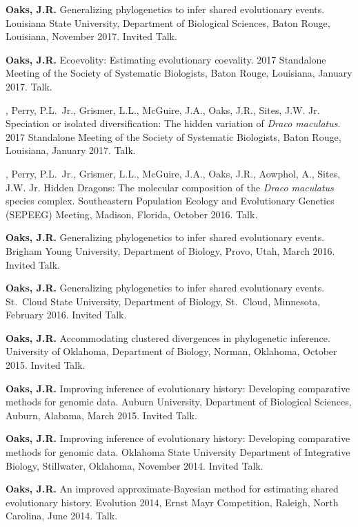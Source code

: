 \myHangIndent
{\bf Oaks, J.R.}
Generalizing phylogenetics to infer shared evolutionary events.
Louisiana State University,
Department of Biological Sciences,
Baton Rouge, Louisiana,
November 2017.
Invited Talk.

\myHangIndent
{\bf Oaks, J.R.}
Ecoevolity: Estimating evolutionary coevality.
2017 Standalone Meeting of the Society of Systematic Biologists,
Baton Rouge, Louisiana,
January 2017.
Talk.

\myHangIndent
{},
Perry, P.L.\ Jr.,
Grismer, L.L.,
McGuire, J.A.,
Oaks, J.R.,
Sites, J.W. Jr.
Speciation or isolated diversification: The hidden variation of \textit{Draco
    maculatus}.
2017 Standalone Meeting of the Society of Systematic Biologists,
Baton Rouge, Louisiana,
January 2017.
Talk.

\myHangIndent
{},
Perry, P.L.\ Jr.,
Grismer, L.L.,
McGuire, J.A.,
Oaks, J.R.,
Aowphol, A.,
Sites, J.W. Jr.
Hidden Dragons: The molecular composition of the \textit{Draco maculatus}
species complex.
Southeastern Population Ecology and Evolutionary Genetics (SEPEEG) Meeting,
Madison, Florida,
October 2016.
Talk.

\myHangIndent
{\bf Oaks, J.R.}
Generalizing phylogenetics to infer shared evolutionary events.
Brigham Young University,
Department of Biology,
Provo,
Utah, March 2016.
Invited Talk.

\myHangIndent
{\bf Oaks, J.R.}
Generalizing phylogenetics to infer shared evolutionary events.
St.\ Cloud State University,
Department of Biology,
St.\ Cloud,
Minnesota, February 2016.
Invited Talk.

\myHangIndent
{\bf Oaks, J.R.}
Accommodating clustered divergences in phylogenetic inference.
University of Oklahoma,
Department of Biology,
Norman,
Oklahoma, October 2015.
Invited Talk.

\myHangIndent
{\bf Oaks, J.R.}
Improving inference of evolutionary history: Developing comparative methods for
genomic data.
Auburn University,
Department of Biological Sciences,
Auburn,
Alabama, March 2015.
Invited Talk.

\myHangIndent
{\bf Oaks, J.R.}
Improving inference of evolutionary history: Developing comparative methods for
genomic data.
Oklahoma State University Department of Integrative Biology, Stillwater,
Oklahoma, November 2014.
Invited Talk.

\myHangIndent
{\bf Oaks, J.R.}
An improved approximate-Bayesian method for estimating shared
evolutionary history.
Evolution 2014, Ernst Mayr Competition, Raleigh, North Carolina, June 2014.
Talk.

